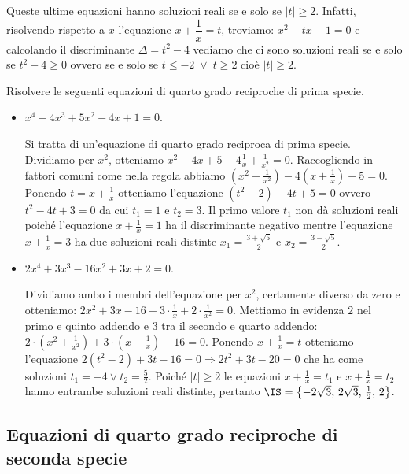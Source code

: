 Queste ultime equazioni hanno soluzioni reali se e solo se $|t|\ge 2$. Infatti, risolvendo rispetto a $x$ l'equazione $x+\dfrac 1 x=t$, troviamo: $x^2-tx+1=0$ e calcolando il discriminante $\Delta =t^2-4$ vediamo che ci sono soluzioni reali se e solo se $t^2-4\ge 0$ ovvero se e solo se $t\le -2 \;\vee\; t\ge 2$ cioè $|t|\ge 2$.
\begin{exrig}
 \begin{esempio}
 Risolvere le seguenti equazioni di quarto grado reciproche di prima specie.
 \begin{itemize}
 \item $x^4-4x^3+5x^2-4x+1=0$.

 Si tratta di un'equazione di quarto grado reciproca di prima specie. Dividiamo per $x^2$, otteniamo $x^2-4x+5-4\frac 1 x+\frac 1{x^2}=0$. Raccogliendo in fattori comuni come nella regola abbiamo $\left(x^2+\frac 1{x^2}\right)-4\left(x+\frac 1 x\right)+5=0$. Ponendo $t=x+\frac 1 x$ otteniamo l'equazione $ \left(t^2-2\right)-4t+5=0$ ovvero $t^2-4t+3=0$ da cui $t_1=1$ e $t_2=3$. Il primo valore $t_1$ non dà soluzioni reali poiché l'equazione $x+\frac 1 x=1$ ha il discriminante negativo mentre l'equazione $x+\frac 1 x=3$ ha due soluzioni reali distinte $x_1=\frac{3+\sqrt 5} 2$ e $x_2=\frac{3-\sqrt 5} 2$.

 \item $ 2x^4+3x^3-16x^2+3x+2=0 $.

 Dividiamo ambo i membri dell'equazione per $x^2$, certamente diverso da zero e otteniamo: $2x^2+3x-16+3\cdot \frac 1 x+2\cdot \frac 1{x^2}=0$. Mettiamo in evidenza $ 2 $ nel primo e quinto addendo e $ 3 $ tra il secondo e quarto addendo: $2\cdot \left(x^2+\frac 1{x^2}\right)+3\cdot \left(x+\frac 1 x\right)-16=0$. Ponendo $x+\frac 1 x=t$ otteniamo l'equazione $2(t^2-2)+3t-16=0\Rightarrow 2t^2+3t-20=0$ che ha come soluzioni $t_1=-4\vee t_2=\frac 5 2$. Poiché $|t|\ge 2$ le equazioni $x+\frac 1 x=t_1$ e $x+\frac 1 x=t_2$ hanno entrambe soluzioni reali distinte, pertanto $\IS=\left\{-2\sqrt{3}\text{, }2\sqrt{3}\text{, }\frac 1 2\text{, }2\right\}$.
 \end{itemize}
 \end{esempio}
\end{exrig}
\ovalbox{\risolvii \ref{ese:5.45}, \ref{ese:5.46}}

\subsection{Equazioni di quarto grado reciproche di seconda specie}

